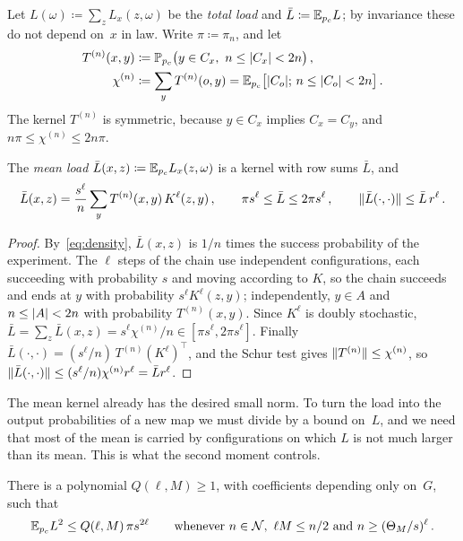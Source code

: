 Let $L(\omega)\coloneqq\sum_zL_x(z,\omega)$ be the \emph{total load} and $\bar L\coloneqq\mathbb E_{p_c}L$; by
invariance these do not depend on~$x$ in law. Write $\pi\coloneqq\pi_n$, and let
\begin{align*}
  T^{(n)}(x,y)&\coloneqq\PP_{p_c}\bigl(y\in C_x,\ n\le\abs{C_x}<2n\bigr)\,,\\
  \chi^{(n)}&\coloneqq\sum_yT^{(n)}(o,y)=\EE_{p_c}\bigl[\abs{C_o};\,n\le\abs{C_o}<2n\bigr]\,.
\end{align*}
The kernel $T^{(n)}$ is symmetric, because $y\in C_x$ implies $C_x=C_y$, and
$n\pi\le\chi^{(n)}\le2n\pi$.

\begin{lemma}\label{lem:mean-load}
The \emph{mean load} $\bar L(x,z)\coloneqq\mathbb E_{p_c}L_x(z,\omega)$ is a kernel with row sums $\bar L$, and
\begin{equation}\label{eq:mean-load}
  \bar L(x,z)=\frac{s^\ell}n\sum_yT^{(n)}(x,y)\,K^\ell(z,y)\,,\qquad
  \pi s^\ell\le\bar L\le2\pi s^\ell\,,\qquad\lVert\bar L(\cdot,\cdot)\rVert\le\bar L\,r^\ell\,.
\end{equation}
\end{lemma}

\begin{proof}
By~\eqref{eq:density}, $\bar L(x,z)$ is $1/n$ times the success probability of the experiment. The $\ell$ steps
of the chain use independent configurations, each succeeding with probability $s$ and moving according
to $K$, so the chain succeeds and ends at $y$ with probability $s^\ell K^\ell(z,y)$; independently, $y\in A$
and $n\le\lvert A\rvert<2n$ with probability $T^{(n)}(x,y)$. Since $K^\ell$ is doubly stochastic,
$\bar L=\sum_z\bar L(x,z)=s^\ell\chi^{(n)}/n\in[\pi s^\ell,2\pi s^\ell]$. Finally
$\bar L(\cdot,\cdot)=(s^\ell/n)\,T^{(n)}(K^\ell)^\top$, and the Schur test gives
$\lVert T^{(n)}\rVert\le\chi^{(n)}$, so $\lVert\bar L(\cdot,\cdot)\rVert\le(s^\ell/n)\chi^{(n)}r^\ell=\bar Lr^\ell$.
\end{proof}

The mean kernel already has the desired small norm. To turn the load into the output probabilities of a
new map we must divide by a bound on~$L$, and we need that most of the mean is carried by
configurations on which $L$ is not much larger than its mean. This is what the second moment controls.

\begin{lemma}\label{lem:second-moment}
There is a polynomial $Q(\ell,M)\ge1$, with coefficients depending only on~$G$, such that
\begin{equation}\label{eq:second-moment}
  \mathbb E_{p_c}L^2\le Q(\ell,M)\,\pi s^{2\ell}\qquad\text{whenever }n\in\mathcal N,\ \ell M\le n/2\text{ and }
  n\ge(\Theta_M/s)^\ell\,.
\end{equation}
\end{lemma}

